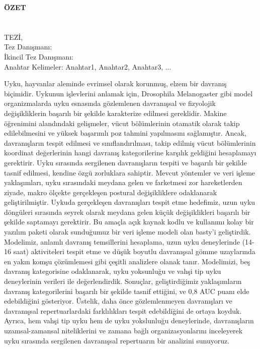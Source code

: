 \clearpage\pagebreak
\begin{center}
    \MakeUppercase{\textbf{Özet}} \\ [3\baselineskip]
    \MakeUppercase{\thesistitletr} \\ [3\baselineskip]
    \MakeUppercase{\student} \\[\baselineskip]
    \MakeUppercase{\majortr \degreetr Tez\.{ı}, \monthtr~\year} \\[\baselineskip]
    Tez Danışmanı: \advisortr \\
    İkincil Tez Danışmanı: \coadvisortr \\
    [2\baselineskip]
    Anahtar Kelimeler: Anahtar1, Anahtar2, Anahtar3, ... \\[2\baselineskip]
\end{center}

\onehalfspacing

Uyku, hayvanlar aleminde evrimsel olarak korunmuş, elzem bir davranış biçimidir. Uykunun işlevlerini anlamak için, Drosophila Melanogaster gibi model organizmalarda uyku esnasında gözlemlenen davranışsal ve fizyolojik değişikliklerin başarılı bir şekilde karakterize edilmesi gereklidir. Makine öğrenimini alandındaki gelişmeler, vücut bölümlerinin otamatik olarak takip edilebilmesini ve yüksek başarımlı poz tahmini yapılmasını sağlamıştır. Ancak, davranışların tespit edilmesi ve sınıflandırılması, takip edilmiş vücut bölümlerinin koordinat değerlerinin hangi davranış kategorilerine karşılık geldiğini hesaplamayı gerektirir. Uyku sırasında sergilenen davranışların tespiti ve başarılı bir şekilde tasnif edilmesi, kendine özgü zorluklara sahiptir. Mevcut yöntemler ve veri işleme yaklaşımları, uyku sırasındaki meydana gelen ve farketmesi zor hareketlerden ziyade, makro ölçekte gerçekleşen postural değişikliklere odaklanarak geliştirilmiştir. Uykuda gerçekleşen davranışları tespit etme hedefimiz, uzun uyku döngüleri sırasında seyrek olarak meydana gelen küçük değişiklikleri başarılı bir şekilde saptamayı gerektirir.  Bu amaçla açık kaynak kodlu ve kullanımı kolay bir yazılım paketi olarak sunduğumuz bir veri işleme modeli olan basty’i geliştirdik. Modelimiz, anlamlı davranış temsillerini hesaplama, uzun uyku deneylerinde (14-16 saat) aktiviteleri tespit etme ve düşük boyutlu davranışsal gömme uzaylarında en yakın komşu çözümlemesi gibi çeşitli analizlere olanak tanır. Modelimizi, beş davranış kategorisine odaklanarak, uyku yoksunluğu ve vahşi tip uyku deneylerinin verileri ile değerlendirdik. Sonuçlar, geliştirdiğimiz yaklaşımların davranış kategorilerini başarılı bir şekilde tasnif ettiğini, ve 0,8 AUC puanı elde edebildiğini gösteriyor. Üstelik, daha önce gözlemlenmeyen davranışları ve davranışsal repertuarlardaki farklılıkları tespit edebildiğini de ortaya koyduk. Ayrıca, hem vahşi tip uyku hem de uyku yokslunluğu deneylerinde, davranışların uzamsal-zamansal niteliklerini ve zamana bağlı organizasyonlarını inceleyerek uyku sırasında sergilenen davranışsal repertuarın bir analizini sunuyoruz.
